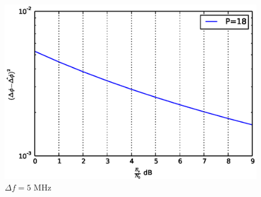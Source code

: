 \documentclass[journal,12pt,twocolumn]{IEEEtran}
\begin{document}
\begin{figure}[!hb]
\begin{center}
\includegraphics[width=\columnwidth]{./figs/Phase_error_with_respect_to_SNR_fixed_pilot.eps}
\end{center}
\caption{$\Delta f = 5$ MHz}
\label{fig:phaseerrorsnr}
\end{figure}
%

%
%
%
%
\end{document}
